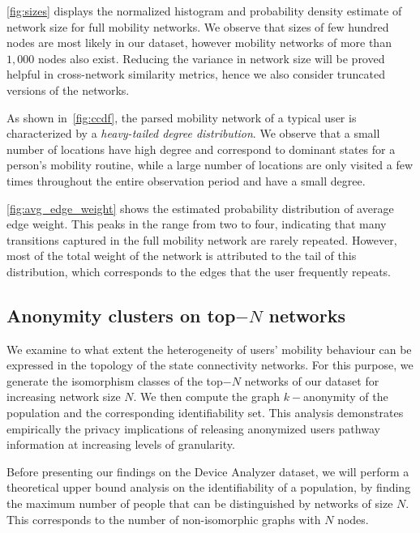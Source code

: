 \cref{fig:sizes} displays the normalized histogram and probability density estimate of network size for full mobility networks.
We observe that sizes of few hundred nodes are most likely in our dataset, however mobility networks of more than $1,000$ nodes also exist.
Reducing the variance in network size will be proved helpful in cross-network similarity metrics, hence we also consider truncated versions of the networks.

As shown in~\cref{fig:ccdf}, the parsed mobility network of a typical user is characterized by a \emph{heavy-tailed degree distribution}. We observe that a small number of locations have high degree and correspond to dominant states for a person's mobility routine, while a large number of locations are only visited a few times throughout the entire observation period and have a small degree.

 \cref{fig:avg_edge_weight} shows the estimated probability distribution of average edge weight.
 This peaks in the range from two to four, indicating that many transitions captured in the full mobility network are rarely repeated. However, most of the total weight of the network is attributed to the tail of this distribution, which corresponds to the edges that the user frequently repeats.

\subsection{Anonymity clusters on top$-N$  networks}\label{sec:anonymity-clusters}


We examine to what extent the heterogeneity of users' mobility behaviour can be expressed in the topology of the state connectivity networks.
For this purpose, we generate the isomorphism classes of the top$-N$ networks of our dataset for increasing network size $ N $.
We then compute the graph $k-$anonymity of the population and the corresponding identifiability set.
This analysis demonstrates empirically the privacy implications of releasing anonymized users pathway information at increasing levels of granularity.

Before presenting our findings on the Device Analyzer dataset, we will perform a theoretical upper bound analysis on the identifiability of a population, by finding the maximum number of people that can be distinguished by networks of size $ N $.
This corresponds to the number of non-isomorphic graphs with $ N $ nodes.

